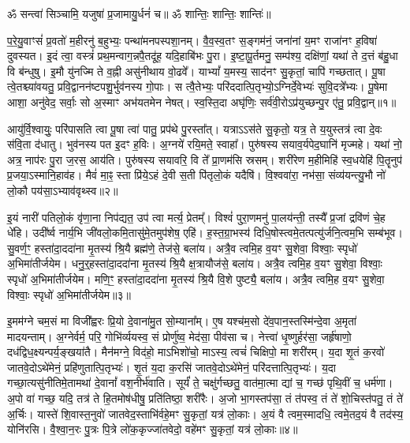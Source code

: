 \setcounter{anuvakam}{0}
ॐ सन्त्वा॑ सिञ्चामि॒ यजुषा॑ प्र॒जामायु॒र्धनं॑ च॥ ॐ शान्तिः॒ शान्तिः॒ शान्तिः॑॥

प॒रे॒यु॒वाꣳसं॑ प्र॒वतो॑ म॒हीरनु॑ ब॒हुभ्यः॒ पन्था॑मनपस्पशा॒नम्। 
वै॒व॒स्व॒तꣳ स॒ङ्गम॑नं॒ जना॑नां य॒मꣳ राजा॑नꣳ ह॒विषा॑ दुवस्यत। 
इ॒दं त्वा॒ वस्त्रं॑ प्रथ॒मन्वाग॒न्नपै॒तदू॑ह॒ यदि॒हाबि॑भः पु॒रा। 
इ॒ष्टा॒पू॒र्तमनु॒ सम्प॑श्य॒ दक्षि॑णां॒ यथा॑ ते द॒त्तं ब॑हु॒धा वि ब॑न्धुषु। 
इ॒मौ यु॑नज्मि ते व॒ह्नी असु॑नीथाय वो॒ढवे᳚। 
याभ्यां᳚ य॒मस्य॒ साद॑नꣳ सु॒कृतां॒ चापि॑ गच्छतात्। 
पू॒षा त्वे॒तश्च्या॑वयतु॒ प्रवि॒द्वानन॑ष्टपशु॒र्भुव॑नस्य गो॒पाः। 
स त्वै॒तेभ्यः॒ परि॑ददात्पि॒तृभ्यो॒ऽग्निर्दे॒वेभ्यः॑ सुवि॒दत्रे᳚भ्यः। 
पू॒षेमा आशा॒ अनु॑वेद॒ सर्वाः॒ सो अ॒स्माꣳ अभ॑यतमेन नेषत्। 
स्व॒स्ति॒दा अघृ॑णिः॒ सर्व॑वी॒रोऽप्र॑युच्छन्पु॒र ए॑तु॒ प्रवि॒द्वान्॥१॥\ip

आयु॑र्वि॒श्वायुः॒ परि॑पासति त्वा पू॒षा त्वा॑ पातु॒ प्रप॑थे पु॒रस्ता᳚त्। 
यत्राऽऽस॑ते सु॒कृतो॒ यत्र॒ ते य॒युस्तत्र॑ त्वा दे॒वः स॑वि॒ता द॑धातु। 
भुव॑नस्य पत इ॒दꣳ ह॒विः। 
अ॒ग्नये॑ रयि॒मते॒ स्वाहा᳚। 
पुरु॑षस्य सयाव॒र्यपेद॒घानि॑ मृज्महे। 
यथा॑ नो॒ अत्र॒ नाप॑रः पु॒रा ज॒रस॒ आय॑ति। 
पुरु॑षस्य सयावरि॒ वि ते᳚ प्रा॒णम॑सि स्रसम्। 
शरी॑रेण म॒हीमिहि॑ स्व॒धयेहि॑ पि॒तॄनुप॑ प्र॒जया॒ऽस्मानि॒हाव॑ह। 
मैवं॑ मा॒ꣴ॒ स्ता प्रि॑ये॒ऽहं दे॒वी स॒ती पि॑तृलो॒कं यदैषि॑। 
वि॒श्ववा॑रा॒ नभ॑सा॒ संव्य॑यन्त्यु॒भौ नो॑ लो॒कौ पय॑सा॒ऽभ्याव॑वृथ्स्व॥२॥\ip

इ॒यं नारी॑ पतिलो॒कं वृ॑णा॒ना निप॑द्यत॒ उप॑ त्वा मर्त्य॒ प्रेतम्᳚। 
विश्वं॑ पुरा॒णमनु॑ पा॒लय॑न्ती॒ तस्यै᳚ प्र॒जां द्रवि॑णं चे॒ह धे॑हि। 
उदी᳚र्ष्व नार्य॒भि जी॑वलो॒कमि॒तासु॑मे॒तमुप॑शेष॒ एहि॑। 
ह॒स्त॒ग्रा॒भस्य॑ दिधि॒षोस्त्वमे॒तत्पत्यु॑र्जनि॒त्वम॒भि सम्ब॑भूव। 
सु॒वर्ण॒ꣳ॒ हस्ता॑दा॒ददा॑ना मृ॒तस्य॑ श्रि॒यै ब्रह्म॑णे॒ तेज॑से॒ बला॑य। 
अत्रै॒व त्वमि॒ह व॒यꣳ सु॒शेवा॒ विश्वाः॒ स्पृधो॑ अ॒भिमा॑तीर्जयेम। 
धनु॒र्॒\mbox{}हस्ता॑दा॒ददा॑ना मृ॒तस्य॑ श्रि॒यै क्ष॒त्रायौज॑से॒ बला॑य। 
अत्रै॒व त्वमि॒ह व॒यꣳ सु॒शेवा॒ विश्वाः॒ स्पृधो॑ अ॒भिमा॑तीर्जयेम। 
मणि॒ꣳ॒ हस्ता॑दा॒ददा॑ना मृ॒तस्य॑ श्रि॒यै वि॒शे पुष्ट्यै॒ बला॑य। 
अत्रै॒व त्वमि॒ह व॒यꣳ सु॒शेवा॒ विश्वाः॒ स्पृधो॑ अ॒भिमा॑तीर्जयेम॥३॥\ip

इ॒मम॑ग्ने चम॒सं मा विजी᳚ह्वरः प्रि॒यो दे॒वाना॑मु॒त सो॒म्याना᳚म्। 
ए॒ष यश्च॑म॒सो दे॑व॒पान॒स्तस्मि॑न्दे॒वा अ॒मृता॑ मादयन्ताम्। 
अ॒ग्नेर्वर्म॒ परि॒ गोभि॑र्व्ययस्व॒ सं प्रोर्णु॑ष्व॒ मेद॑सा॒ पीव॑सा च। 
नेत्त्वा॑ धृ॒ष्णुर्\mbox{}हर॑सा॒ जर्\mbox{}हृ॑षाणो॒ दध॑द्विध॒क्ष्यन्पर्य॒ङ्खया॑तै। 
मैन॑मग्ने॒ विद॑हो॒ माऽभिशो॑चो॒ माऽस्य॒ त्वचं॑ चिक्षिपो॒ मा शरी॑रम्। 
य॒दा शृ॒तं क॒रवो॑ जातवे॒दोऽथे॑मेनं॒ प्रहि॑णुतात्पि॒तृभ्यः॑। 
शृ॒तं य॒दा क॒रसि॑ जातवे॒दोऽथे॑मेनं॒ परि॑दत्तात्पि॒तृभ्यः॑। 
य॒दा गच्छा॒त्यसु॑नीतिमे॒तामथा॑ दे॒वानां᳚ वश॒नीर्भ॑वाति। 
सूर्यं॑ ते॒ चक्षु॑र्गच्छतु॒ वात॑मा॒त्मा द्यां च॒ गच्छ॑ पृथि॒वीं च॒ धर्म॑णा। 
अ॒पो वा॑ गच्छ॒ यदि॒ तत्र॑ ते हि॒तमोष॑धीषु॒ प्रति॑तिष्ठा॒ शरी॑रैः। 
अ॒जो भा॒गस्तप॑सा॒ तं त॑पस्व॒ तं ते॑ शो॒चिस्त॑पतु॒ तं ते॑ अ॒र्चिः। 
यास्ते॑ शि॒वास्त॒नुवो॑ जातवेद॒स्ताभि॑र्वहे॒मꣳ सु॒कृतां॒ यत्र॑ लो॒काः। 
अ॒यं वै त्वम॒स्मादधि॒ त्वमे॒तद॒यं वै तद॑स्य॒ योनि॑रसि। 
वै॒श्वा॒न॒रः पु॒त्रः पि॒त्रे लो॑क॒कृज्जा॑तवेदो॒ वहे॑मꣳ सु॒कृतां॒ यत्र॑ लो॒काः॥४॥\ip
\anuvakamend[वि॒द्वान॒भ्याव॑वृथ्स्वा॒भिमा॑तीर्जयेम॒ शरी॑रैश्च॒त्वारि॑ च]

